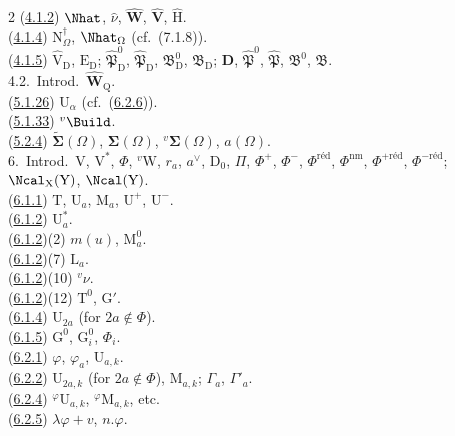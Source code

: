 \documentclass[12pt,a4paper,oneside,english]{smfart}
\newcommand{\btref}[1]{\hyperlink{bt:#1}{#1}}
\theoremstyle{definition}
\theoremstyle{bt}
\begin{document}
\begin{multicols}{2}
(\btref{4.1.2}) $\Nhat$, $\widehat{\nu}$, $\widehat{\mathbf{W}}$, $\widehat{\mathbf{V}}$, $\widehat{\mathrm{H}}$.\\
(\btref{4.1.4}) $\mathrm{N}^{\dagger}_{\Omega}$, $\Nhat_{\Omega}$ (cf.\ (7.1.8)).\\
(\btref{4.1.5}) $\widehat{\mathrm{V}}_{\mathrm{D}}$, $\mathrm{E}_{\mathrm{D}}$; $\widehat{\mathfrak{P}}^{0}_{\mathrm{D}}$, $\widehat{\mathfrak{P}}_{\mathrm{D}}$, $\mathfrak{B}^{0}_{\mathrm{D}}$, $\mathfrak{B}_{\mathrm{D}}$; $\mathbf{D}$, $\widehat{\mathfrak{P}}^{0}$, $\widehat{\mathfrak{P}}$, $\mathfrak{B}^{0}$, $\mathfrak{B}$.\\
4.2.\ Introd.\ $\widehat{\mathbf{W}}_{\mathrm{Q}}$.\\
(\btref{5.1.26}) $\mathrm{U}_\alpha$ (cf.\ (\btref{6.2.6})).\\
(\btref{5.1.33}) $^{v}\Build$.\\
(\btref{5.2.4}) $\widetilde{\boldsymbol{\Sigma}}(\Omega)$, $\boldsymbol{\Sigma}(\Omega)$, $^{v}\boldsymbol{\Sigma}(\Omega)$, $a(\Omega)$.\\
6.\ Introd.\ $\mathrm{V}$, $\mathrm{V}^{*}$, $\Phi$, $^{v}\mathrm{W}$, $r_a$, $a^{\vee}$, $\mathrm{D}_0$, $\Pi$, $\Phi^{+}$, $\Phi^{-}$, $\Phi^{\text{réd}}$, $\Phi^{\text{nm}}$, $\Phi^{+\text{réd}}$, $\Phi^{-\text{réd}}$; $\Ncal_{\mathrm{X}}(\mathrm{Y})$, $\Ncal(\mathrm{Y})$.\\
(\btref{6.1.1}) $\mathrm{T}$, $\mathrm{U}_a$, $\mathrm{M}_a$, $\mathrm{U}^{+}$, $\mathrm{U}^{-}$.\\
(\btref{6.1.2}) $\mathrm{U}^{*}_a$.\\
(\btref{6.1.2})(2) $m(u)$, $\mathrm{M}^{0}_a$.\\
(\btref{6.1.2})(7) $\mathrm{L}_a$.\\
(\btref{6.1.2})(10) $^{v}\nu$.\\
(\btref{6.1.2})(12) $\mathrm{T}^{0}$, $\mathrm{G}'$.\\
(\btref{6.1.4}) $\mathrm{U}_{2a}$ (for $2a\notin\Phi$).\\
(\btref{6.1.5}) $\mathrm{G}^{0}$, $\mathrm{G}^{0}_i$, $\Phi_i$.\\
(\btref{6.2.1}) $\varphi$, $\varphi_a$, $\mathrm{U}_{a,k}$.\\
(\btref{6.2.2}) $\mathrm{U}_{2a,k}$ (for $2a\notin\Phi$), $\mathrm{M}_{a,k}$; $\Gamma_a$, $\Gamma'_a$.\\
(\btref{6.2.4}) $^{\varphi}\mathrm{U}_{a,k}$, $^{\varphi}\mathrm{M}_{a,k}$, etc.\\
(\btref{6.2.5}) $\lambda\varphi+v$, $n.\varphi$.\\

\end{multicols}
\end{document}
